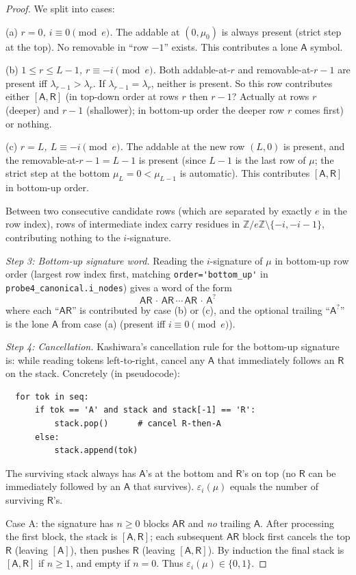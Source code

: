 \documentclass[11pt]{article}
\theoremstyle{definition}
\newcommand{\ZZ}{\mathbb{Z}}
\newcommand{\eps}{\varepsilon}
\newcommand{\Aa}{{\mathsf A}}
\newcommand{\Rr}{{\mathsf R}}
\begin{document}
\begin{proof}
We split into cases:

(a) \emph{$r = 0$, $i \equiv 0 \pmod e$.} The addable at $(0, \mu_0)$ is
always present (strict step at the top). No removable in ``row $-1$''
exists. This contributes a lone $\Aa$ symbol.

(b) \emph{$1 \le r \le L - 1$, $r \equiv -i \pmod e$.} Both addable-at-$r$
and removable-at-$r-1$ are present iff $\lambda_{r-1} > \lambda_r$. If
$\lambda_{r-1} = \lambda_r$, neither is present. So this row contributes
either $[\Aa, \Rr]$ (in top-down order at rows $r$ then $r - 1$? Actually
at rows $r$ (deeper) and $r - 1$ (shallower); in bottom-up order the
deeper row $r$ comes first) or nothing.

(c) \emph{$r = L$, $L \equiv -i \pmod e$.} The addable at the new row
$(L, 0)$ is present, and the removable-at-$r-1 = L - 1$ is present
(since $L - 1$ is the last row of $\mu$; the strict step at the bottom
$\mu_L = 0 < \mu_{L-1}$ is automatic). This contributes $[\Aa, \Rr]$ in
bottom-up order.

Between two consecutive candidate rows (which are separated by exactly
$e$ in the row index), rows of intermediate index carry residues in
$\ZZ/e\ZZ \setminus \{-i, -i-1\}$, contributing nothing to the
$i$-signature.

\medskip
\emph{Step 3: Bottom-up signature word.} Reading the $i$-signature of $\mu$
in bottom-up row order (largest row index first, matching
\verb|order='bottom_up'| in \verb|probe4_canonical.i_nodes|) gives a word
of the form
\[
  \Aa\Rr \,\cdot\, \Aa\Rr \,\cdots\, \Aa\Rr \,\cdot\, \Aa^?
\]
where each ``$\Aa\Rr$'' is contributed by case (b) or (c), and the
optional trailing ``$\Aa^?$'' is the lone $\Aa$ from case (a) (present
iff $i \equiv 0 \pmod e$).

\medskip
\emph{Step 4: Cancellation.} Kashiwara's cancellation rule for the
bottom-up signature is: while reading tokens left-to-right, cancel any
$\Aa$ that immediately follows an $\Rr$ on the stack. Concretely (in
pseudocode):
\begin{verbatim}
  for tok in seq:
      if tok == 'A' and stack and stack[-1] == 'R':
          stack.pop()      # cancel R-then-A
      else:
          stack.append(tok)
\end{verbatim}
The surviving stack always has $\Aa$'s at the bottom and $\Rr$'s on top
(no $\Rr$ can be immediately followed by an $\Aa$ that survives).
$\eps_i(\mu)$ equals the number of surviving $\Rr$'s.

Case A: the signature has $n \ge 0$ blocks $\Aa\Rr$ and \emph{no} trailing
$\Aa$. After processing the first block, the stack is $[\Aa, \Rr]$; each
subsequent $\Aa\Rr$ block first cancels the top $\Rr$ (leaving $[\Aa]$),
then pushes $\Rr$ (leaving $[\Aa, \Rr]$). By induction the final stack is
$[\Aa, \Rr]$ if $n \ge 1$, and empty if $n = 0$. Thus $\eps_i(\mu) \in \{0, 1\}$.


\end{proof}
\end{document}
